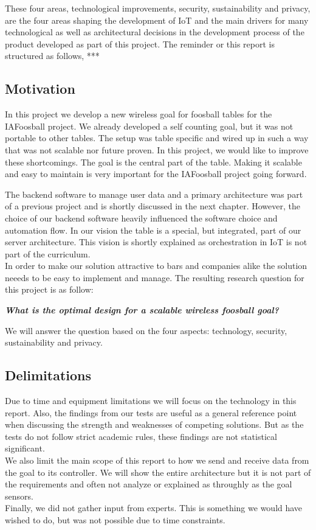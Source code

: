 These four areas, technological improvements, security, sustainability and privacy, are the four areas shaping the development of IoT and the main drivers for many technological as well as architectural decisions in the development process of the product developed as part of this project. The reminder or this report is structured as follows, *** 

\subsection{Motivation}
In this project we develop a new wireless goal for foosball tables for the IAFoosball project. We already developed a self counting goal, but it was not portable to other tables. The setup was table specific and wired up in such a way that was not scalable nor future proven. In this project, we would like to improve these shortcomings. The goal is the central part of the table. Making  it scalable and easy to maintain is very important for the IAFoosball project going forward. 

The backend software to manage user data and a primary architecture was part of a previous project and is shortly discussed in the next chapter. However, the choice of our backend software heavily influenced the software choice and automation flow. 
In our vision the table is a special, but integrated, part of our server architecture. This vision is shortly explained as orchestration in IoT is not part of the curriculum.\\

In order to make our solution attractive to bars and companies alike the solution neeeds to be easy to implement and manage. The resulting research question for this project is as follow:
\begin{center}
    \textbf{\textit{What is the optimal design for a scalable wireless foosball goal?}}
\end{center}
We will answer the question based on the four aspects: technology, security, sustainability and privacy. 

\subsection{Delimitations}
Due to time and equipment limitations we will focus on the technology in this report. Also, the findings from our tests are useful as a general reference point when discussing the strength and weaknesses of competing solutions. But as the tests do not follow strict academic rules, these findings are not statistical significant. \\
We also limit the main scope of this report to how we send and receive data from the goal to its controller. We will show the entire architecture but it is not part of the requirements and often not analyze or explained as throughly as the goal sensors.\\
Finally, we did not gather input from experts. This is something we would have wished to do, but was not possible due to time constraints.